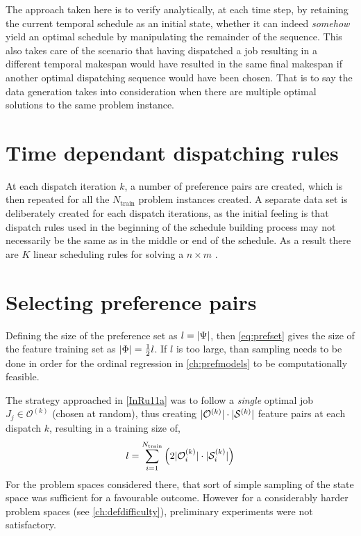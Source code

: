 The approach taken here is to verify analytically, at each time step, by retaining the current temporal schedule as an initial state, whether it can indeed \emph{somehow} yield an optimal schedule by manipulating the remainder of the sequence. 
This also takes care of the scenario that having dispatched a job resulting in a different temporal makespan would have resulted in the same final makespan if another optimal dispatching sequence would have been chosen. 
That is to say the data generation takes into consideration when there are multiple optimal solutions to the same problem instance. 

\section{Time dependant dispatching rules}
At each dispatch iteration $k$, a number of preference pairs are created, which is then repeated for all the $N_{\text{train}}$ problem instances created. 
A separate data set is deliberately created for each dispatch iterations, as 
the initial feeling is that dispatch rules used in the beginning of the 
schedule building process may not necessarily be the same as in the middle or 
end of the schedule. As a result there are $K$ linear scheduling rules for 
solving a $n \times m$ \jsp. 



\section{Selecting preference pairs}\label{sec:trdat:param}
Defining the size of the preference set as $l=\lvert\Psi\rvert$, then 
\cref{eq:prefset} gives the size of the feature training set as 
$\lvert\Phi\rvert=\frac{1}{2}l$.
If $l$ is too large, than sampling needs to be done in order for the ordinal 
regression in \cref{ch:prefmodels} to be computationally feasible.

The strategy approached in  \cref{InRu11a} was to follow a \emph{single} 
optimal job $J_j\in\mathcal{O}^{(k)}$ (chosen at random), thus creating 
$\lvert\mathcal{O}^{(k)}\rvert\cdot\lvert\mathcal{S}^{(k)}\rvert$ feature pairs at each 
dispatch $k$, resulting in a training size of,
\begin{equation}\label{eq:sizePsi_b}
l =  \sum_{i=1}^{N_{\text{train}}} \left(2 \abs{\mathcal{O}^{(k)}_i}\cdot 
\abs{\mathcal{S}^{(k)}_i} \right)
\end{equation}
For the problem spaces considered there, that sort of simple sampling of the 
state space was sufficient for a favourable outcome. However for a considerably 
harder problem spaces (see \cref{ch:defdifficulty}), preliminary experiments 
were not satisfactory. 


